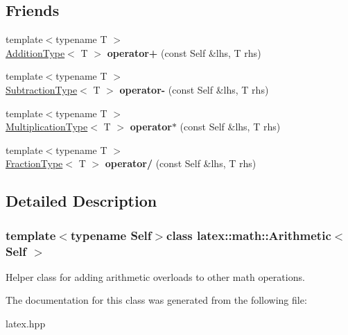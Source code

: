 \subsection*{Friends}
\begin{DoxyCompactItemize}
\item 
\hypertarget{classlatex_1_1math_1_1Arithmetic_a723185210d9371d99122644212c27804}{{\footnotesize template$<$typename T $>$ }\\\hyperlink{classlatex_1_1math_1_1Addition}{Addition\-Type}$<$ T $>$ {\bfseries operator+} (const Self \&lhs, T rhs)}\label{classlatex_1_1math_1_1Arithmetic_a723185210d9371d99122644212c27804}

\item 
\hypertarget{classlatex_1_1math_1_1Arithmetic_a52cc8d111ab9bc86be444a30821be8bd}{{\footnotesize template$<$typename T $>$ }\\\hyperlink{classlatex_1_1math_1_1Subtraction}{Subtraction\-Type}$<$ T $>$ {\bfseries operator-\/} (const Self \&lhs, T rhs)}\label{classlatex_1_1math_1_1Arithmetic_a52cc8d111ab9bc86be444a30821be8bd}

\item 
\hypertarget{classlatex_1_1math_1_1Arithmetic_a36b3fccce6395ab2e8effe6cd705195c}{{\footnotesize template$<$typename T $>$ }\\\hyperlink{classlatex_1_1math_1_1Multiplication}{Multiplication\-Type}$<$ T $>$ {\bfseries operator$\ast$} (const Self \&lhs, T rhs)}\label{classlatex_1_1math_1_1Arithmetic_a36b3fccce6395ab2e8effe6cd705195c}

\item 
\hypertarget{classlatex_1_1math_1_1Arithmetic_af953ccc64ff8027e3b02a0ccb4013ea8}{{\footnotesize template$<$typename T $>$ }\\\hyperlink{classlatex_1_1math_1_1Fraction}{Fraction\-Type}$<$ T $>$ {\bfseries operator/} (const Self \&lhs, T rhs)}\label{classlatex_1_1math_1_1Arithmetic_af953ccc64ff8027e3b02a0ccb4013ea8}

\end{DoxyCompactItemize}


\subsection{Detailed Description}
\subsubsection*{template$<$typename Self$>$class latex\-::math\-::\-Arithmetic$<$ Self $>$}

Helper class for adding arithmetic overloads to other math operations. 

The documentation for this class was generated from the following file\-:\begin{DoxyCompactItemize}
\item 
latex.\-hpp\end{DoxyCompactItemize}
